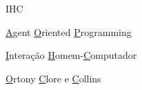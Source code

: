 \begin{listofabbrv}{IHC}
		\item[AOP] \underline{A}gent \underline{O}riented \underline{P}rogramming
        \item[IHC] \underline{I}ntera\c{c}\~{a}o \underline{H}omem-\underline{C}omputador
        \item[OCC] \underline{O}rtony \underline{C}lore e \underline{C}ollins
\end{listofabbrv}


